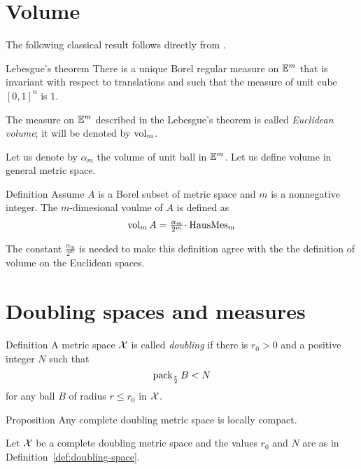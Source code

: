 \section{Volume}

The following classical result follows directly from \cite[2.7.7]{federer}.

\begin{thm}{Lebesgue's theorem}\label{thm:lebesgue}
There is a unique Borel regular  measure on $\mathbb{E}^m$
that is invariant with respect to translations
and such that the measure of unit cube $[0,1]^n$ is $1$.
\end{thm}

The measure on $\mathbb{E}^m$ described in the Lebesgue's theorem is called \emph{Euclidean volume};
it will be denoted by $\mathop{\rm vol}\nolimits_m$.

Let us denote by $\alpha_m$ the volume of unit ball in $\mathbb{E}^m$.
Let us define volume in general metric space.


\begin{thm}{Definition}\label{def:vol}
Assume $A$ is a Borel subset of metric space and $m$ is a nonnegative integer.
The $m$-dimesional voulme of $A$ is defined as 
\[\vol_mA=\tfrac{\alpha_m}{2^m}\cdot\HausMes_m\]
\end{thm}

The constant $\tfrac{\alpha_m}{2^m}$ is needed to make this definition  agree with the 
the definition of volume on the Euclidean spaces.





\section{Doubling spaces and measures}\label{sec:doubling-spaces}

\begin{thm}{Definition}\label{def:doubling-space}
A metric space $\mathcal{X}$ is called 
\emph{doubling} 
if there is $r_0>0$ 
and a positive integer $N$ 
such that 
$$\mathop{\rm pack}\nolimits_{\frac r2} B<N$$
for any ball $B$ of radius $r\le r_0$ in $\mathcal{X}$.
\end{thm}

\begin{thm}{Proposition}\label{prop:2ble=>loc.compact}
Any complete doubling metric space is locally compact.
\end{thm}

 Let $\mathcal{X}$ be a complete doubling metric space 
and the values $r_0$ and $N$ are as in  Definition~\ref{def:doubling-space}.

